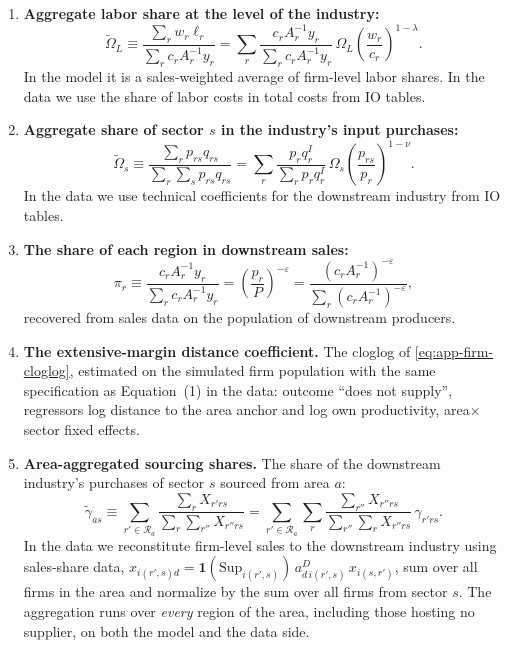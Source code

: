 \begin{enumerate}[topsep=3pt,itemsep=3pt,label=\arabic*.]
\item \textbf{Aggregate labor share at the level of the industry:}
\begin{equation}
\tilde\Omega_{L}\equiv\frac{\sum_{r}w_{r}\ell_{r}}{\sum_{r}c_{r}A_{r}^{-1}y_{r}}
=\sum_{r}\frac{c_{r}A_{r}^{-1}y_{r}}{\sum_{r}c_{r}A_{r}^{-1}y_{r}}\,\Omega_{L}
\left(\frac{w_{r}}{c_{r}}\right)^{1-\lambda}.
\end{equation}
In the model it is a sales-weighted average of firm-level labor shares. In the data we use the
share of labor costs in total costs from IO tables.

\item \textbf{Aggregate share of sector $s$ in the industry's input purchases:}
\begin{equation}
\tilde\Omega_{s}\equiv\frac{\sum_{r}p_{rs}q_{rs}}{\sum_{r}\sum_{s}p_{rs}q_{rs}}
=\sum_{r}\frac{p_{r}q^{I}_{r}}{\sum_{r}p_{r}q^{I}_{r}}\,\Omega_{s}
\left(\frac{p_{rs}}{p_{r}}\right)^{1-\nu}.
\end{equation}
In the data we use technical coefficients for the downstream industry from IO tables.

\item \textbf{The share of each region in downstream sales:}
\begin{equation}
\pi_{r}\equiv\frac{c_{r}A_{r}^{-1}y_{r}}{\sum_{r}c_{r}A_{r}^{-1}y_{r}}
=\left(\frac{p_{r}}{P}\right)^{-\varepsilon}
=\frac{(c_{r}A_{r}^{-1})^{-\varepsilon}}{\sum_{r}(c_{r}A_{r}^{-1})^{-\varepsilon}},
\end{equation}
recovered from sales data on the population of downstream producers.

\item \textbf{The extensive-margin distance coefficient.} The cloglog of
\eqref{eq:app-firm-cloglog}, estimated on the simulated firm population with the same
specification as Equation~(1) in the data: outcome ``does not supply'', regressors log distance
to the area anchor and log own productivity, area$\times$sector fixed effects.

\item \textbf{Area-aggregated sourcing shares.} The share of the downstream industry's purchases
of sector $s$ sourced from area $a$:
\begin{equation}
\tilde\gamma_{as}\equiv\sum_{r'\in\mathcal{R}_{a}}\frac{\sum_{r}X_{r'rs}}{\sum_{r}\sum_{r''}X_{r''rs}}
=\sum_{r'\in\mathcal{R}_{a}}\sum_{r}\frac{\sum_{r''}X_{r''rs}}{\sum_{r''}\sum_{r}X_{r''rs}}\,\gamma_{r'rs}.
\label{eq:app-gamma-area}
\end{equation}
In the data we reconstitute firm-level sales to the downstream industry using sales-share data,
$x_{i(r',s)d}=\mathbf{1}(\mathrm{Sup}_{i(r',s)})\,a^{D}_{d\,i(r',s)}\,x_{i(s,r')}$, sum over all
firms in the area and normalize by the sum over all firms from sector $s$. The aggregation runs
over \emph{every} region of the area, including those hosting no supplier, on both the model and
the data side.


\end{enumerate}

